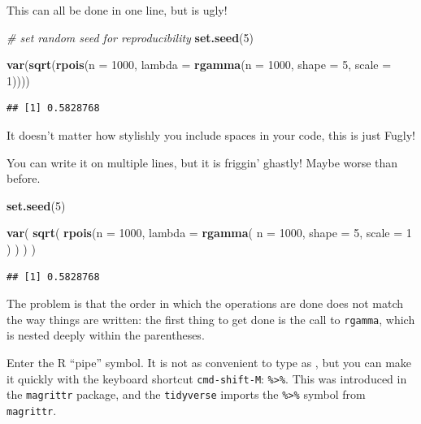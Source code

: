 \documentclass[]{book}
\newenvironment{Shaded}{\begin{snugshade}}{\end{snugshade}}
\newcommand{\KeywordTok}[1]{\textcolor[rgb]{0.13,0.29,0.53}{\textbf{{#1}}}}
\newcommand{\DataTypeTok}[1]{\textcolor[rgb]{0.13,0.29,0.53}{{#1}}}
\newcommand{\DecValTok}[1]{\textcolor[rgb]{0.00,0.00,0.81}{{#1}}}
\newcommand{\CommentTok}[1]{\textcolor[rgb]{0.56,0.35,0.01}{\textit{{#1}}}}
\newcommand{\NormalTok}[1]{{#1}}
\theoremstyle{definition}
\theoremstyle{definition}
\theoremstyle{remark}
\begin{document}
This can all be done in one line, but is ugly!

\begin{Shaded}
\begin{Highlighting}[]
\CommentTok{# set random seed for reproducibility}
\KeywordTok{set.seed}\NormalTok{(}\DecValTok{5}\NormalTok{)}

\KeywordTok{var}\NormalTok{(}\KeywordTok{sqrt}\NormalTok{(}\KeywordTok{rpois}\NormalTok{(}\DataTypeTok{n =} \DecValTok{1000}\NormalTok{, }\DataTypeTok{lambda =} \KeywordTok{rgamma}\NormalTok{(}\DataTypeTok{n =} \DecValTok{1000}\NormalTok{, }\DataTypeTok{shape =} \DecValTok{5}\NormalTok{, }\DataTypeTok{scale =} \DecValTok{1}\NormalTok{))))}
\end{Highlighting}
\end{Shaded}

\begin{verbatim}
## [1] 0.5828768
\end{verbatim}

It doesn't matter how stylishly you include spaces in your code, this is
just Fugly!

You can write it on multiple lines, but it is friggin' ghastly! Maybe
worse than before.

\begin{Shaded}
\begin{Highlighting}[]
\KeywordTok{set.seed}\NormalTok{(}\DecValTok{5}\NormalTok{)}

\KeywordTok{var}\NormalTok{(}
  \KeywordTok{sqrt}\NormalTok{(}
    \KeywordTok{rpois}\NormalTok{(}\DataTypeTok{n =} \DecValTok{1000}\NormalTok{, }\DataTypeTok{lambda =} \KeywordTok{rgamma}\NormalTok{(}
      \DataTypeTok{n =} \DecValTok{1000}\NormalTok{, }\DataTypeTok{shape =} \DecValTok{5}\NormalTok{, }\DataTypeTok{scale =} \DecValTok{1}
    \NormalTok{)}
    \NormalTok{)}
  \NormalTok{)}
\NormalTok{)}
\end{Highlighting}
\end{Shaded}

\begin{verbatim}
## [1] 0.5828768
\end{verbatim}

The problem is that the order in which the operations are done does not
match the way things are written: the first thing to get done is the
call to \texttt{rgamma}, which is nested deeply within the parentheses.

Enter the R ``pipe'' symbol. It is not as convenient to type as
\texttt{\textbar{}}, but you can make it quickly with the keyboard
shortcut \texttt{cmd-shift-M}: \texttt{\%\textgreater{}\%}. This was
introduced in the \texttt{magrittr} package, and the \texttt{tidyverse}
imports the \texttt{\%\textgreater{}\%} symbol from \texttt{magrittr}.
\end{document}
